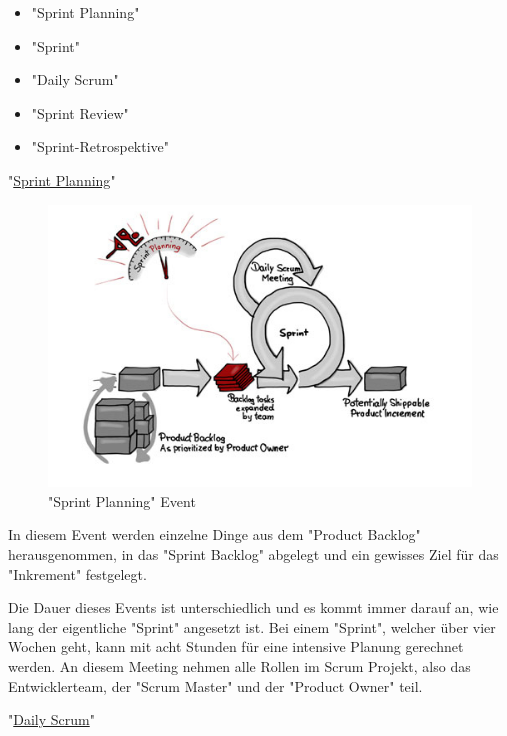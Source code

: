 \begin{itemize}
    \item "Sprint Planning"
    \item "Sprint"
    \item "Daily Scrum"
    \item "Sprint Review"
    \item "Sprint-Retrospektive"
\end{itemize}

\cite{Scrum}

"\underline{Sprint Planning}"

\begin{figure}[H]
    \centering
    \includegraphics[width=\textwidth]{media/ProjectManagement/SprintPlanning.jpg}
    \caption{"Sprint Planning" Event \cite{PlanningBild}}
\end{figure}

In diesem Event werden einzelne Dinge aus dem "Product Backlog" herausgenommen, in das "Sprint Backlog" abgelegt und ein gewisses Ziel für das "Inkrement" festgelegt. \cite{Planning}

Die Dauer dieses Events ist unterschiedlich und es kommt immer darauf an, wie lang der eigentliche "Sprint" angesetzt ist. Bei einem "Sprint", welcher über vier Wochen geht, kann mit acht Stunden für eine intensive Planung gerechnet werden. An diesem Meeting nehmen alle Rollen im Scrum Projekt, also das Entwicklerteam, der "Scrum Master" und der "Product Owner" teil. \cite{Planning}

"\underline{Daily Scrum}"

